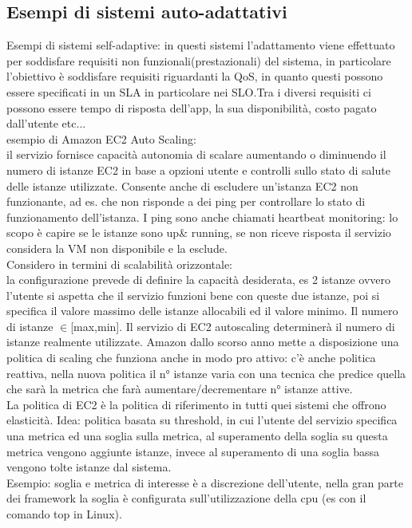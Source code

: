 \documentclass{article}
\begin{document}
\subsection{Esempi di sistemi auto-adattativi}
Esempi di sistemi self-adaptive: in questi sistemi l'adattamento viene effettuato per soddisfare requisiti non funzionali(prestazionali) del sistema, in particolare l'obiettivo è soddisfare requisiti riguardanti la QoS, in quanto questi possono essere specificati in un SLA in particolare nei SLO.Tra i diversi requisiti ci possono essere tempo di risposta dell'app, la sua disponibilità, costo pagato dall'utente etc...\\
esempio di Amazon EC2 Auto Scaling:\\
il servizio fornisce capacità autonomia di scalare aumentando o diminuendo il numero di istanze EC2 in base a opzioni utente e  controlli sullo stato di salute delle istanze utilizzate. Consente anche di escludere un'istanza EC2	non funzionante, ad es. che non risponde a dei ping per controllare lo stato di funzionamento dell'istanza. I ping sono anche chiamati heartbeat monitoring: lo scopo è capire se le istanze sono up\& running, se non riceve risposta il servizio considera la VM non disponibile e la esclude.\\Considero in termini di scalabilità orizzontale:\\
la configurazione prevede di definire la capacità desiderata, es 2 istanze ovvero l'utente si aspetta che il servizio funzioni bene con queste due istanze, poi si specifica il valore massimo delle istanze allocabili ed il valore minimo. Il numero di istanze $\in$[max,min]. Il servizio di EC2 autoscaling determinerà il numero di istanze realmente utilizzate. Amazon dallo scorso anno mette a disposizione una politica di scaling che funziona anche in modo pro attivo:
c'è anche politica reattiva, nella nuova politica il n° istanze varia con una tecnica che predice quella che sarà la metrica che farà aumentare/decrementare n° istanze attive.\\
La politica di EC2 è la politica di riferimento in tutti quei sistemi che offrono elasticità. Idea: politica basata su threshold, in cui l'utente del servizio specifica una metrica ed una soglia sulla metrica, al superamento della soglia su questa metrica vengono aggiunte istanze, invece al superamento di una soglia bassa vengono tolte istanze dal sistema.\\
Esempio: soglia e metrica di interesse è a discrezione dell'utente, nella gran parte dei framework la soglia è configurata sull'utilizzazione della cpu (es con il comando top in Linux).\\
\end{document}
